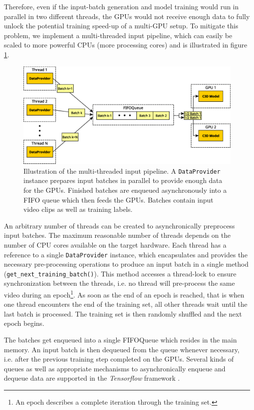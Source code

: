 Therefore, even if the input-batch generation and model training would run in parallel in two different threads, the GPUs would not receive enough data to fully unlock the potential training speed-up of a multi-GPU setup.
To mitigate this problem, we implement a multi-threaded input pipeline, which can easily be scaled to more powerful CPUs (more processing cores) and is illustrated in figure \ref{fig:input_pipeline}.

\begin{figure}[H]
    \centering
    \includegraphics[width=\textwidth]{img_approach/input_pipeline.eps}
    \caption{Illustration of the multi-threaded input pipeline. A \texttt{DataProvider} instance prepares input batches in parallel to provide enough data for the GPUs. Finished batches are enqueued asynchronously into a FIFO queue which then feeds the GPUs. Batches contain input video clips as well as training labels.}
    \label{fig:input_pipeline}
\end{figure}

An arbitrary number of threads can be created to asynchronically preprocess input batches.
The maximum reasonable number of threads depends on the number of CPU cores available on the target hardware.
Each thread has a reference to a single \texttt{DataProvider} instance, which encapsulates and provides the necessary pre-processing operations to produce an input batch in a single method (\texttt{get\_next\_training\_batch()}).
This method accesses a thread-lock to ensure synchronization between the threads, i.e. no thread will pre-process the same video during an epoch\footnote{An epoch describes a complete iteration through the training set.}.
As soon as the end of an epoch is reached, that is when one thread encounters the end of the training set, all other threads wait until the last batch is processed.
The training set is then randomly shuffled and the next epoch begins.

The batches get enqueued into a single FIFOQueue which resides in the main memory.
An input batch is then dequeued from the queue whenever necessary, i.e. after the previous training step completed on the GPUs.
Several kinds of queues as well as appropriate mechanisms to asynchronically enqueue and dequeue data are supported in the \textit{Tensorflow} framework \cite{abadi_tensorflow:_2016}.

